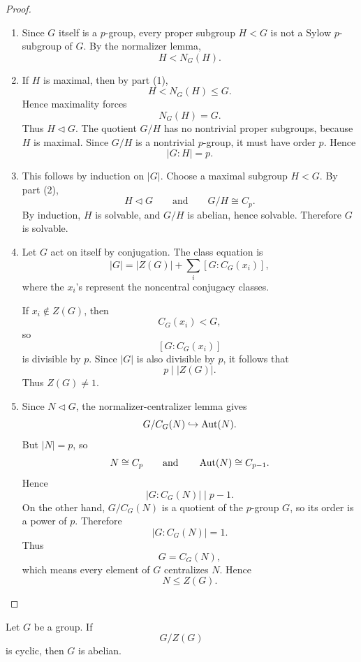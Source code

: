 \begin{proof}
\begin{enumerate}[label=(\arabic*)]
    \item Since \(G\) itself is a \(p\)-group, every proper subgroup \(H<G\) is not a Sylow \(p\)-subgroup of \(G\). By the normalizer lemma,
    \[
        H<N_G(H).
    \]

    \item If \(H\) is maximal, then by part (1),
    \[
        H<N_G(H)\leq G.
    \]
    Hence maximality forces
    \[
        N_G(H)=G.
    \]
    Thus \(H\lhd G\). The quotient \(G/H\) has no nontrivial proper subgroups, because \(H\) is maximal. Since \(G/H\) is a nontrivial \(p\)-group, it must have order \(p\). Hence
    \[
        |G:H|=p.
    \]

    \item This follows by induction on \(|G|\). Choose a maximal subgroup \(H<G\). By part (2),
    \[
        H\lhd G
        \qquad\text{and}\qquad
        G/H\cong C_p.
    \]
    By induction, \(H\) is solvable, and \(G/H\) is abelian, hence solvable. Therefore \(G\) is solvable.

    \item Let \(G\) act on itself by conjugation. The class equation is
    \[
        |G|
        =
        |Z(G)|
        +
        \sum_i [G:C_G(x_i)],
    \]
    where the \(x_i\)'s represent the noncentral conjugacy classes.

    If \(x_i\notin Z(G)\), then
    \[
        C_G(x_i)<G,
    \]
    so
    \[
        [G:C_G(x_i)]
    \]
    is divisible by \(p\). Since \(|G|\) is also divisible by \(p\), it follows that
    \[
        p\mid |Z(G)|.
    \]
    Thus \(Z(G)\neq 1\).

    \item Since \(N\lhd G\), the normalizer-centralizer lemma gives
    \[
        G/C_G(N)
        \hookrightarrow
        \operatorname{Aut}(N).
    \]
    But \(|N|=p\), so
    \[
        N\cong C_p
        \qquad\text{and}\qquad
        \operatorname{Aut}(N)\cong C_{p-1}.
    \]
    Hence
    \[
        |G:C_G(N)|
        \mid p-1.
    \]
    On the other hand, \(G/C_G(N)\) is a quotient of the \(p\)-group \(G\), so its order is a power of \(p\). Therefore
    \[
        |G:C_G(N)|=1.
    \]
    Thus
    \[
        G=C_G(N),
    \]
    which means every element of \(G\) centralizes \(N\). Hence
    \[
        N\leq Z(G).
    \]
\end{enumerate}
\end{proof}

\begin{lemma}
    Let \(G\) be a group. If
    \[
        G/Z(G)
    \]
    is cyclic, then \(G\) is abelian.
    \end{lemma}
    
